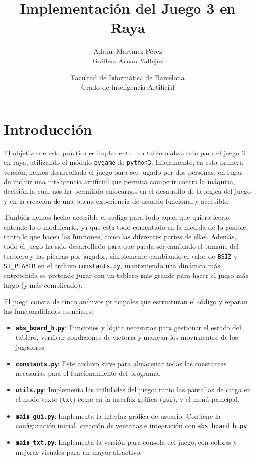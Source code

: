 \documentclass[a4paper,12pt]{article}
\title{Implementación del Juego 3 en Raya}
\author{Adrián Martínez Pérez \\ Guillem Arnau Vallejos}
\date{Facultad de Informática de Barcelona \\ Grado de Inteligencia Artificial}
\begin{document}
\maketitle
\tableofcontents
\newpage

\section{Introducción}
El objetivo de esta práctica es implementar un tablero abstracto para el juego 3 en raya, utilizando el módulo
\texttt{pygame} de \texttt{python3}. Inicialmente, en esta primera versión, hemos desarrollado el juego para ser
 jugado por dos personas, en lugar de incluir una inteligencia artificial que permita competir contra la máquina,
 decisión la cual nos ha permitido enfocarnos en el desarrollo de la lógica del juego y en la creación de una buena 
 experiencia de usuario funcional y accesible.

 \vspace{\baselineskip}
 También hemos hecho accesible el código para todo aquel que quiera leerlo, entenderlo o modificarlo, ya que está todo
 comentado en la medida de lo posible, tanto lo que hacen las funciones, como las diferentes partes de ellas. 
 Además, todo el juego ha sido desarrollado para que pueda ser cambiado el tamaño del teablero y las piedras por jugador,
 simplemente cambiando el valor de \texttt{BSIZ} y \texttt{ST\_PLAYER} en el archivo \texttt{constants.py}, manteniendo una 
 dinámica más entretenida se pretende jugar con un tablero más grande para hacer el juego más largo (y más complicado).

 \vspace{\baselineskip}
 El juego consta de cinco archivos principales que estructuran el código 
 y separan las funcionalidades esenciales:

 \begin{itemize}
    \item \textbf{\texttt{abs\_board\_h.py}}: Funciones y lógica necesarias para gestionar el estado del tablero,
    verificar condiciones de victoria y manejar los movimientos de los jugadores.
    \item \textbf{\texttt{constants.py}}: Este archivo sirve para almacenar todas las constantes necesarias para el
    funcionamiento del programa.
    \item \textbf{\texttt{utils.py}}: Implementa las utilidades del juego: tanto las pantallas de carga en el modo texto
    (\texttt{txt}) como en la interfaz gráfica (\texttt{gui}), y el menú principal.
    \item \textbf{\texttt{main\_gui.py}}: Implementa la interfaz gráfica de usuario. Contiene la configuración inicial,
    creación de ventanas e integración con \texttt{abs\_board\_h.py}.
    \item \textbf{\texttt{main\_txt.py}}: Implementa la versión para consola del juego, con colores y mejoras visuales
    para un mayor atractivo.
\end{itemize}
\end{document}

